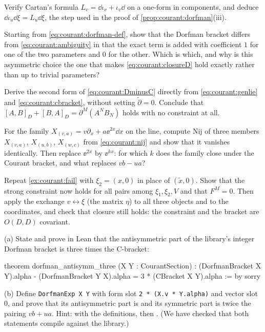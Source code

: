 \begin{exercise}[$\star$]
Verify Cartan's formula $L_v=\dd\iota_v+\iota_v\dd$ on a one-form in components, and deduce
$\dd\iota_u\dd\xi=L_u\dd\xi$, the step used in the proof of \cref{prop:courant:dorfman}(iii).
\end{exercise}

\begin{exercise}[$\star$]
Starting from \eqref{eq:courant:dorfman-def}, show that the Dorfman bracket differs from \eqref{eq:courant:ambiguity} in that the exact term
is added with coefficient $1$ for one of the two parameters and $0$ for the other. Which is
which, and why is this asymmetric choice the one that makes \eqref{eq:courant:closureD} hold
exactly rather than up to trivial parameters?
\end{exercise}

\begin{exercise}[$\star\star$]
Derive the second form of \eqref{eq:courant:DminusC} directly from \eqref{eq:courant:genlie} and
\eqref{eq:courant:cbracket}, without setting $\tilde\partial=0$. Conclude that
$[A,B]_D+[B,A]_D=\partial^M(A^NB_N)$ holds with no constraint at all.
\end{exercise}

\begin{exercise}[$\star\star$]\label{exr:courant:family}
For the family $X_{(v,a)}=v\partial_x+a\ee^{2x}\dd x$ on the line, compute $\mathrm{Nij}$ of
three members $X_{(v,a)}$, $X_{(u,b)}$, $X_{(w,c)}$ from \eqref{eq:courant:nij} and show that it
vanishes identically. Then replace $\ee^{2x}$ by $\ee^{kx}$: for which $k$ does the family close
under the Courant bracket, and what replaces $vb-ua$?
\end{exercise}

\begin{exercise}[$\star\star$]
Repeat \cref{ex:courant:fail} with $\xi_2=(x,0)$ in place of $(\tilde x,0)$. Show that the strong
constraint now holds for all pairs among $\xi_1,\xi_2,V$ and that $F^M=0$. Then apply the
exchange $v\leftrightarrow\xi$ (the matrix $\eta$) to all three objects and to the coordinates, and
check that closure still holds: the constraint and the bracket are $O(D,D)$ covariant.
\end{exercise}

\begin{exercise}\label{exr:courant:leanfix}
(a) State and prove in Lean that the antisymmetric part of the library's integer Dorfman bracket
is three times the C-bracket:
\begin{leancode}
theorem dorfman_antisymm_three (X Y : CourantSection) :
    (DorfmanBracket X Y).alpha - (DorfmanBracket Y X).alpha
      = 3 * (CBracket X Y).alpha := by
  sorry
\end{leancode}
(b) Define \texttt{DorfmanExp X Y} with form slot \texttt{2 * (X.v * Y.alpha)} and vector slot $0$, and
prove that its antisymmetric part is  and its symmetric part is
twice the pairing $vb+ua$. Hint:  with the definitions, then . (We have
checked that both statements compile against the library.)
\end{exercise}

